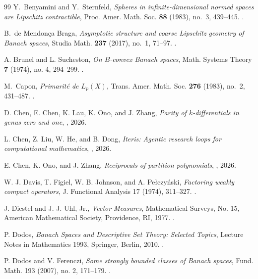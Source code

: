 \documentclass[11pt,reqno]{amsart}
\theoremstyle{plain}
\theoremstyle{definition}
\begin{document}
\begin{thebibliography}{99}
Y.~Benyamini and Y.~Sternfeld,
\newblock \emph{Spheres in infinite-dimensional normed spaces are Lipschitz contractible},
\newblock Proc. Amer. Math. Soc. \textbf{88} (1983), no.~3, 439--445.
\newblock {}.

B.~de Mendon\c{c}a Braga,
\newblock \emph{Asymptotic structure and coarse Lipschitz geometry of Banach spaces},
\newblock Studia Math. \textbf{237} (2017), no.~1, 71--97.
\newblock {}.


A. Brunel and L. Sucheston,
\newblock \emph{On $B$-convex Banach spaces},
\newblock Math. Systems Theory \textbf{7} (1974), no. 4, 294--299.
\newblock {}.

M.~Capon,
\newblock \emph{Primarit\'e de $L_p(X)$},
\newblock Trans. Amer. Math. Soc. \textbf{276} (1983), no.~2, 431--487.
\newblock {}.

D. Chen, E. Chen, K. Lau, K. Ono, and J. Zhang,
\newblock \emph{Parity of $k$-differentials in genus zero and one},
\newblock {}, 2026.

L. Chen, Z. Liu, W. He, and B. Dong,
\newblock \emph{Iteris: Agentic research loops for computational mathematics},
\newblock {}, 2026.

E. Chen, K. Ono, and J. Zhang,
\newblock \emph{Reciprocals of partition polynomials},
\newblock {}, 2026.

W. J. Davis, T. Figiel, W. B. Johnson, and A. Pe{\l}czy\'nski,
\newblock \emph{Factoring weakly compact operators},
\newblock J. Functional Analysis 17 (1974), 311--327.
\newblock {}.

J. Diestel and J. J. Uhl, Jr.,
\newblock \emph{Vector Measures},
\newblock Mathematical Surveys, No. 15, American Mathematical Society, Providence, RI, 1977.
\newblock {}.

P. Dodos,
\newblock \emph{Banach Spaces and Descriptive Set Theory: Selected Topics},
\newblock Lecture Notes in Mathematics 1993, Springer, Berlin, 2010.
\newblock {}.

P. Dodos and V. Ferenczi,
\newblock \emph{Some strongly bounded classes of Banach spaces},
\newblock Fund. Math. 193 (2007), no. 2, 171--179.
\newblock {}.


\end{thebibliography}
\end{document}

